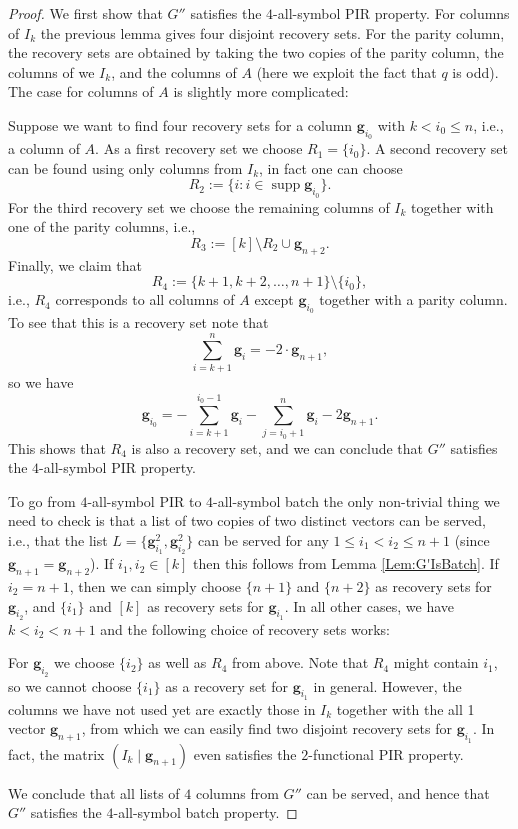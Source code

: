 \documentclass[11pt,a4paper]{article}
\theoremstyle{definition}
\newcommand{\bfg}{{\boldsymbol g}}
\newcommand{\supp}{\operatorname{supp}}
\begin{document}
\begin{proof}

    We first show that $G''$ satisfies the $4$-all-symbol PIR property. For columns of $I_k$ the previous lemma gives four disjoint recovery sets. For the parity column, the recovery sets are obtained by taking the two copies of the parity column, the columns of we $I_k$, and the columns of $A$ (here we exploit the fact that $q$ is odd). The case for columns of $A$ is slightly more complicated:

    Suppose we want to find four recovery sets for a column $\bfg_{i_0}$ with $k < i_0 \leq n$, i.e., a column of $A$. As a first recovery set we choose $R_1 = \{ i_0\}$. A second recovery set can be found using only columns from $I_k$, in fact one can choose
    $$
        R_2 := \{ i : i \in \supp \bfg_{i_0} \}.
    $$
    For the third recovery set we choose the remaining columns of $I_k$ together with one of the parity columns, i.e., 
    $$
        R_3 := [k]\setminus R_2 \cup \bfg_{n+2}.
    $$
    Finally, we claim that
    $$
        R_4 := \{k+1,  k+2, \dots, n+1\} \setminus \{ i_0 \},
    $$
    i.e., $R_4$ corresponds to all columns of $A$ except $\bfg_{i_0}$ together with a parity column. To see that this is a recovery set note that
    $$
        \sum_{i= k+1}^{n} \bfg_i= -2\cdot \bfg_{n+1},
    $$
    so we have
    $$
        \bfg_{i_0} = -\sum_{i= k+1}^{i_0-1} \bfg_{i}-\sum_{j= i_0+1}^{n} \bfg_{i} - 2\bfg_{n+1}.
    $$
    This shows that $R_4$ is also a recovery set, and we can conclude that $G''$ satisfies the $4$-all-symbol PIR property.

    To go from $4$-all-symbol PIR to $4$-all-symbol batch the only non-trivial thing we need to check is that a list of two copies of two distinct vectors can be served, i.e., that the list $L = \{\bfg_{i_1}^2,\bfg_{i_2}^2\}$ can be served for any $1\leq i_1 < i_2 \leq n+1$ (since $\bfg_{n+1} = \bfg_{n+2}$). If $i_1,i_2 \in [k]$ then this follows from Lemma \ref{Lem:G'IsBatch}. If $i_2 = n+1$, then we can simply choose $\{n+1\}$ and $\{n+2\}$ as recovery sets for $\bfg_{i_2}$, and $\{i_1\}$ and $[k]$ as recovery sets for $\bfg_{i_1}$. In all other cases, we have $k < i_2 < n+1$ and the following choice of recovery sets works:

    For $\bfg_{i_2}$ we choose $\{i_2\}$ as well as $R_4$ from above. Note that $R_4$ might contain $i_1$, so we cannot choose $\{i_1\}$ as a recovery set for $\bfg_{i_1}$ in general. However, the columns we have not used yet are exactly those in $I_k$ together with the all 1 vector $\bfg_{n+1}$, from which we can easily find two disjoint recovery sets for $\bfg_{i_1}$. In fact, the matrix $(I_k \mid \bfg_{n+1})$ even satisfies the $2$-functional PIR property.
    
    We conclude that all lists of $4$ columns from $G''$ can be served, and hence that $G''$ satisfies the $4$-all-symbol batch property.
\end{proof}
\end{document}
